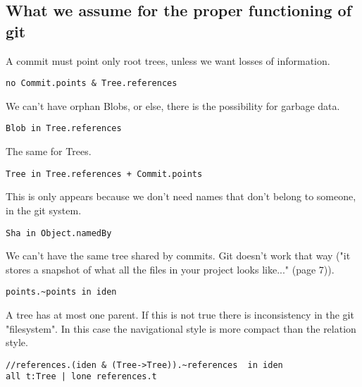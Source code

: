 \subsection{What we assume for the proper functioning of git}

A commit must point only root trees, unless we want
losses of information.
\begin{lstlisting}
no Commit.points & Tree.references    
\end{lstlisting}

We can't have orphan Blobs, or else, 
there is the possibility for garbage data.
\begin{lstlisting}
Blob in Tree.references
\end{lstlisting}

The same for Trees.
\begin{lstlisting}
Tree in Tree.references + Commit.points
\end{lstlisting}

This is only appears because we don't need
names that don't belong to someone, in the git
system.
\begin{lstlisting}
Sha in Object.namedBy
\end{lstlisting}

We can't have the same tree shared by commits. Git
doesn't work that way ("it stores a snapshot of what all 
the files in your project looks like..." \cite{gitComm} (page 7)).
\begin{lstlisting}
points.~points in iden 
\end{lstlisting}

A tree has at most one parent. If this is not true there 
is inconsistency in the git "filesystem". In this case the navigational style is more compact than the relation style.
\begin{lstlisting}
//references.(iden & (Tree->Tree)).~references  in iden
all t:Tree | lone references.t
\end{lstlisting}

